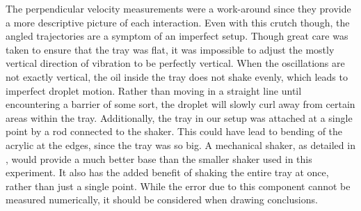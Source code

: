 The perpendicular velocity measurements were a work-around since they provide a more descriptive picture of each interaction. Even with this crutch though, the angled trajectories are a symptom of an imperfect setup. Though great care was taken to ensure that the tray was flat, it was impossible to adjust the mostly vertical direction of vibration to be perfectly vertical. When the oscillations are not exactly vertical, the oil inside the tray does not shake evenly, which leads to imperfect droplet motion. Rather than moving in a straight line until encountering a barrier of some sort, the droplet will slowly curl away from certain areas within the tray. Additionally, the tray in our setup was attached at a single point by a rod connected to the shaker. This could have lead to bending of the acrylic at the edges, since the tray was so big. A mechanical shaker, as detailed in , would provide a much better base than the smaller shaker used in this experiment. It also has the added benefit of shaking the entire tray at once, rather than just a single point. While the error due to this component cannot be measured numerically, it should be considered when drawing conclusions.




